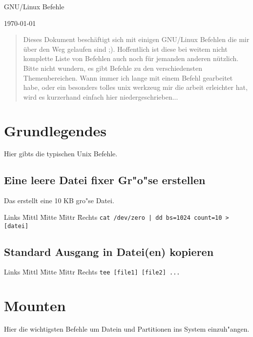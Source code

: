 \documentclass[12pt]{article}
\newenvironment{code}{\begin{tabbing}Links \= Mittl \= Mitte \= Mittr \= Rechts \kill}{\end{tabbing}}
\begin{document}
\pagestyle{empty}

\label{cover_page}

\begin{center}
	\huge{GNU/Linux Befehle\\}
\end{center}

\begin{center}
	\today
\end{center}

\begin{abstract}
	\label{the_abstract}
	Dieses Dokument beschäftigt sich mit einigen GNU/Linux Befehlen die
	mir über den Weg gelaufen sind ;). Hoffentlich ist diese bei weitem nicht 
	komplette Liste von Befehlen auch noch für jemanden anderen nützlich.
	Bitte nicht wundern, es gibt Befehle zu den verschiedensten Themenbereichen. Wann immer
	ich lange mit einem Befehl gearbeitet habe, oder ein besonders tolles unix werkzeug mir
	die arbeit erleichter hat, wird es kurzerhand einfach hier niedergeschrieben...
\end{abstract}
\newpage

\tableofcontents

\newpage
\section{Grundlegendes}
Hier gibts die typischen Unix Befehle.
\subsection{Eine leere Datei fixer Gr"o"se erstellen}
Das erstellt eine 10 KB gro"se Datei.
\begin{code}
	\> \verb#cat /dev/zero | dd bs=1024 count=10 > [datei]#
\end{code}
\subsection{Standard Ausgang in Datei(en) kopieren}
\begin{code}
	\> \verb#tee [file1] [file2] ...#
\end{code}

\section{Mounten}
Hier die wichtigsten Befehle um Datein und Partitionen ins System einzuh"angen.
\end{document}
